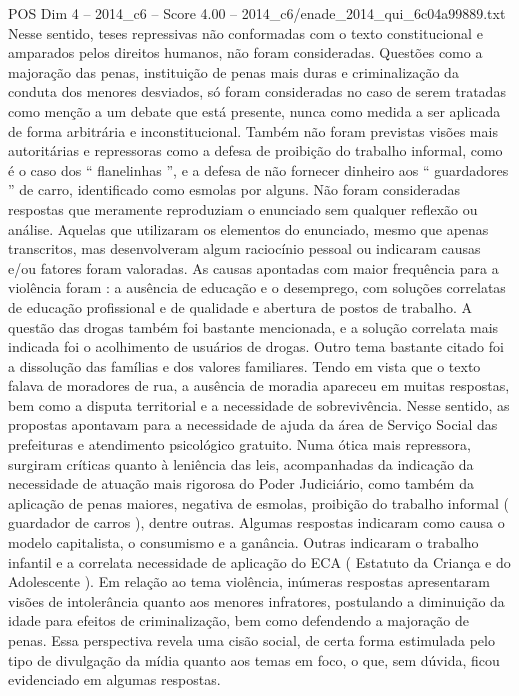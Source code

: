 \begin{textsample}{POS Dim 4 – 2014\_c6 – Score 4.00 – 2014\_c6/enade\_2014\_qui\_6c04a99889.txt}
Nesse sentido, teses repressivas não conformadas com o texto constitucional e amparados pelos direitos humanos, não foram consideradas.
Questões como a majoração das penas, instituição de penas mais duras e criminalização da conduta dos menores desviados, só foram consideradas no caso de serem tratadas como menção a um debate que está presente, nunca como medida a ser aplicada de forma arbitrária e inconstitucional.
Também não foram previstas visões mais autoritárias e repressoras como a defesa de proibição do trabalho informal, como é o caso dos “ flanelinhas ”, e a defesa de não fornecer dinheiro aos “ guardadores ” de carro, identificado como esmolas por alguns.
Não foram consideradas respostas que meramente reproduziam o enunciado sem qualquer reflexão ou análise.
Aquelas que utilizaram os elementos do enunciado, mesmo que apenas transcritos, mas desenvolveram algum raciocínio pessoal ou indicaram causas e/ou fatores foram valoradas.
As causas apontadas com maior frequência para a violência foram : a ausência de educação e o desemprego, com soluções correlatas de educação profissional e de qualidade e abertura de postos de trabalho.
A questão das drogas também foi bastante mencionada, e a solução correlata mais indicada foi o acolhimento de usuários de drogas.
Outro tema bastante citado foi a dissolução das famílias e dos valores familiares.
Tendo em vista que o texto falava de moradores de rua, a ausência de moradia apareceu em muitas respostas, bem como a disputa territorial e a necessidade de sobrevivência.
Nesse sentido, as propostas apontavam para a necessidade de ajuda da área de Serviço Social das prefeituras e atendimento psicológico gratuito.
Numa ótica mais repressora, surgiram críticas quanto à leniência das leis, acompanhadas da indicação da necessidade de atuação mais rigorosa do Poder Judiciário, como também da aplicação de penas maiores, negativa de esmolas, proibição do trabalho informal ( guardador de carros ), dentre outras.
Algumas respostas indicaram como causa o modelo capitalista, o consumismo e a ganância.
Outras indicaram o trabalho infantil e a correlata necessidade de aplicação do ECA ( Estatuto da Criança e do Adolescente ).
Em relação ao tema violência, inúmeras respostas apresentaram visões de intolerância quanto aos menores infratores, postulando a diminuição da idade para efeitos de criminalização, bem como defendendo a majoração de penas.
Essa perspectiva revela uma cisão social, de certa forma estimulada pelo tipo de divulgação da mídia quanto aos temas em foco, o que, sem dúvida, ficou evidenciado em algumas respostas.

\end{textsample}
